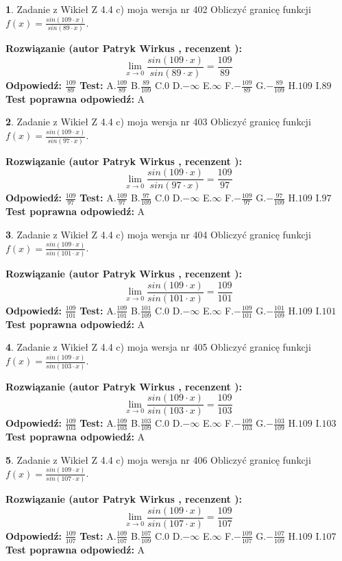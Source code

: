 \documentclass[12pt, a4paper]{article}
\theoremstyle{definition} %
\newtheorem{zad}{}
\newcommand{\zadStart}[1]{\begin{zad}#1\newline}
\newcommand{\zadStop}{\end{zad}}
\newcommand{\rozwStart}[2]{\noindent \textbf{Rozwiązanie (autor #1 , recenzent #2): }\newline}
\newcommand{\rozwStop}{\newline}
\newcommand{\odpStart}{\noindent \textbf{Odpowiedź:}\newline}
\newcommand{\odpStop}{\newline}
\newcommand{\testStart}{\noindent \textbf{Test:}\newline}
\newcommand{\testStop}{\newline}
\newcommand{\kluczStart}{\noindent \textbf{Test poprawna odpowiedź:}\newline}
\newcommand{\kluczStop}{\newline}
\begin{document}
\zadStart{Zadanie z Wikieł Z 4.4 c) moja wersja nr 402}
Obliczyć granicę funkcji $f(x)=\frac{sin(109\cdot x)}{sin(89\cdot x)}$.
\zadStop
\rozwStart{Patryk Wirkus}{}
$$\lim\limits_{x\to 0}\frac{sin(109\cdot x)}{sin(89\cdot x)}=
\frac{109}{89}$$
\rozwStop
\odpStart
$\frac{109}{89}$
\odpStop
\testStart
A.$\frac{109}{89}$
B.$\frac{89}{109}$
C.$0$
D.$-\infty$
E.$\infty$
F.$-\frac{109}{89}$
G.$-\frac{89}{109}$
H.$109$
I.$89$
\testStop
\kluczStart
A
\kluczStop



\zadStart{Zadanie z Wikieł Z 4.4 c) moja wersja nr 403}
Obliczyć granicę funkcji $f(x)=\frac{sin(109\cdot x)}{sin(97\cdot x)}$.
\zadStop
\rozwStart{Patryk Wirkus}{}
$$\lim\limits_{x\to 0}\frac{sin(109\cdot x)}{sin(97\cdot x)}=
\frac{109}{97}$$
\rozwStop
\odpStart
$\frac{109}{97}$
\odpStop
\testStart
A.$\frac{109}{97}$
B.$\frac{97}{109}$
C.$0$
D.$-\infty$
E.$\infty$
F.$-\frac{109}{97}$
G.$-\frac{97}{109}$
H.$109$
I.$97$
\testStop
\kluczStart
A
\kluczStop



\zadStart{Zadanie z Wikieł Z 4.4 c) moja wersja nr 404}
Obliczyć granicę funkcji $f(x)=\frac{sin(109\cdot x)}{sin(101\cdot x)}$.
\zadStop
\rozwStart{Patryk Wirkus}{}
$$\lim\limits_{x\to 0}\frac{sin(109\cdot x)}{sin(101\cdot x)}=
\frac{109}{101}$$
\rozwStop
\odpStart
$\frac{109}{101}$
\odpStop
\testStart
A.$\frac{109}{101}$
B.$\frac{101}{109}$
C.$0$
D.$-\infty$
E.$\infty$
F.$-\frac{109}{101}$
G.$-\frac{101}{109}$
H.$109$
I.$101$
\testStop
\kluczStart
A
\kluczStop



\zadStart{Zadanie z Wikieł Z 4.4 c) moja wersja nr 405}
Obliczyć granicę funkcji $f(x)=\frac{sin(109\cdot x)}{sin(103\cdot x)}$.
\zadStop
\rozwStart{Patryk Wirkus}{}
$$\lim\limits_{x\to 0}\frac{sin(109\cdot x)}{sin(103\cdot x)}=
\frac{109}{103}$$
\rozwStop
\odpStart
$\frac{109}{103}$
\odpStop
\testStart
A.$\frac{109}{103}$
B.$\frac{103}{109}$
C.$0$
D.$-\infty$
E.$\infty$
F.$-\frac{109}{103}$
G.$-\frac{103}{109}$
H.$109$
I.$103$
\testStop
\kluczStart
A
\kluczStop



\zadStart{Zadanie z Wikieł Z 4.4 c) moja wersja nr 406}
Obliczyć granicę funkcji $f(x)=\frac{sin(109\cdot x)}{sin(107\cdot x)}$.
\zadStop
\rozwStart{Patryk Wirkus}{}
$$\lim\limits_{x\to 0}\frac{sin(109\cdot x)}{sin(107\cdot x)}=
\frac{109}{107}$$
\rozwStop
\odpStart
$\frac{109}{107}$
\odpStop
\testStart
A.$\frac{109}{107}$
B.$\frac{107}{109}$
C.$0$
D.$-\infty$
E.$\infty$
F.$-\frac{109}{107}$
G.$-\frac{107}{109}$
H.$109$
I.$107$
\testStop
\kluczStart
A
\kluczStop
\end{document}
